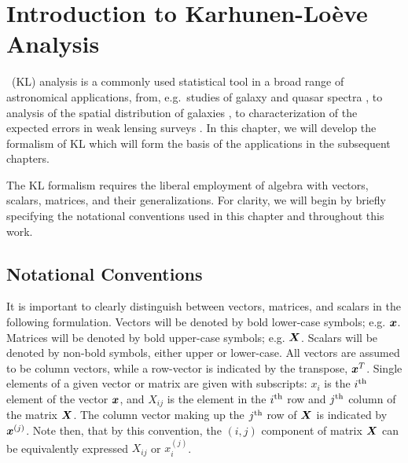 \chapter{Introduction to Karhunen-Lo\`{e}ve Analysis}



\KL\ (KL) analysis is a commonly used statistical tool
in a broad range of astronomical applications, from, e.g.~studies of 
galaxy and quasar spectra \citep{Connolly95,Connolly99,Yip04a,Yip04b}, to 
analysis of the spatial distribution of galaxies 
\citep{Vogeley96,Matsubara00,Pope04}, to characterization of the 
expected errors in weak lensing surveys \citep{Kilbinger06, Munshi06}.
In this chapter, we will develop the formalism of KL which will form
the basis of the applications in the subsequent chapters.

The KL formalism requires the liberal
employment of algebra with vectors, scalars, matrices, and their
generalizations.
For clarity, we will begin by briefly specifying the notational
conventions used in this chapter and throughout this work.

\section{Notational Conventions}

It is important to clearly distinguish between vectors, matrices, and
scalars in the following formulation.  Vectors will be denoted by
bold lower-case symbols; e.g. $\boldsymbol{x}$.  Matrices will be denoted by
bold upper-case symbols; e.g. $\boldsymbol{X}$.  Scalars will be denoted by
non-bold symbols, either upper or lower-case.
All vectors are assumed to be column vectors, while a row-vector is
indicated by the transpose, $\boldsymbol{x}^T$.  
Single elements of a given
vector or matrix are given with subscripts: $x_i$ is the $i^{\rm th}$
element of the vector $\boldsymbol{x}$, and $X_{ij}$ is the element in the
$i^{\rm th}$ row and $j^{\rm th}$ column of the matrix $\boldsymbol{X}$.
The column vector making up the $j^{\rm th}$ row of $\boldsymbol{X}$ is
indicated by $\boldsymbol{x}^{(j)}$.  Note then, that by this convention,
the $(i, j)$ component of matrix $\boldsymbol{X}$ can be equivalently expressed
$X_{ij}$ or $x_i^{(j)}$.

